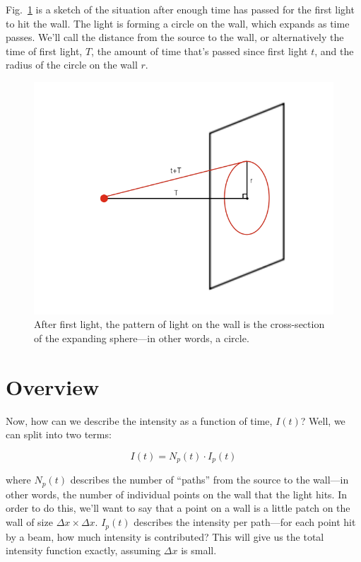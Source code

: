\documentclass[11pt]{article}
\begin{document}
Fig.~\ref{fig:wallcircle} is a sketch of the situation after enough time has passed for the first light to hit the wall. The light is forming a circle on the wall, which expands as time passes. We'll call the distance from the source to the wall, or alternatively the time of first light, $T$, the amount of time that's passed since first light $t$, and the radius of the circle on the wall $r$.

\begin{figure}
\begin{center}
\includegraphics[scale=0.6]{figs/expandingsource.png}
\caption{After first light, the pattern of light on the wall is the cross-section of the expanding sphere---in other words, a circle. \label{fig:wallcircle}}
\end{center}
\end{figure}

\section{Overview}

Now, how can we describe the intensity as a function of time, $I(t)$? Well, we can split into two terms:

$$I(t) = N_p(t) \cdot I_p(t)$$

where $N_p(t)$ describes the number of ``paths'' from the source to the wall---in other words, the number of individual points on the wall that the light hits. In order to do this, we'll want to say that a point on a wall is a little patch on the wall of size $\Delta x \times \Delta x$. $I_p(t)$ describes the intensity per path---for each point hit by a beam, how much intensity is contributed? This will give us the total intensity function exactly, assuming $\Delta x$ is small.
\end{document}
